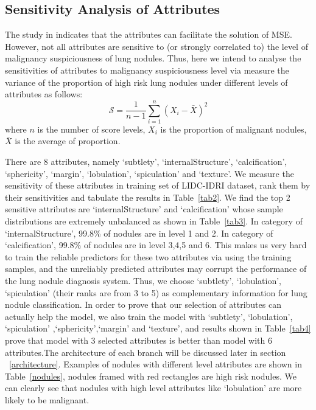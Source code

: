 \documentclass[runningheads]{llncs}
\begin{document}
\subsection{Sensitivity Analysis of Attributes}
\label{select}
The study in \cite{Hussein2017Risk} indicates that the attributes can facilitate the solution of MSE. However, not all attributes are sensitive to (or strongly correlated to) the level of malignancy suspiciousness of lung nodules. Thus, here we intend to analyse the sensitivities of attributes to malignancy suspiciousness level via measure the variance of the proportion of high risk lung nodules under different levels of attributes as follows:
\begin{equation}
\mathcal{S} = \frac{1}{n-1}\sum_{i=1}^n (X_i - \bar{X})^{2}
\end{equation}
where $n$ is the number of score levels,  $X_i$ is the proportion of malignant nodules, $\bar{X}$ is the average of proportion.

There are 8 attributes, namely `subtlety', `internalStructure', `calcification', `sphericity', `margin', `lobulation', `spiculation' and `texture'.
We measure the sensitivity of these attributes in training set of LIDC-IDRI dataset, rank them by their sensitivities and tabulate the results in Table~\ref{tab2}. We find the top 2 sensitive attributes are `internalStructure' and `calcification' whose sample distributions are extremely unbalanced as shown in Table~\ref{tab3}.  In category of `internalStructure', 99.8\% of nodules are in level 1 and 2. In category of `calcification', 99.8\% of nodules are in level 3,4,5 and 6. This makes us very hard to train the reliable predictors for these two attributes via using the training samples, and the unreliably predicted attributes may corrupt the performance of the lung nodule diagnosis system. Thus, we choose `subtlety', `lobulation', `spiculation' (their ranks are from 3 to 5) as complementary information for lung nodule classification. In order to prove that our selection of attributes can actually help the model, we also train the model with  `subtlety', `lobulation', `spiculation' ,`sphericity',`margin' and `texture',  and results shown in Table~\ref{tab4} prove that model with 3 selected attributes is better than model with 6 attributes.The architecture of each branch will be discussed later in section ~\ref{architecture}.
Examples of nodules with different level attributes are shown in Table~\ref{nodules}, nodules framed with red rectangles are high risk nodules. We can clearly see that nodules with high level attributes like `lobulation' are more likely to be malignant.
\end{document}
